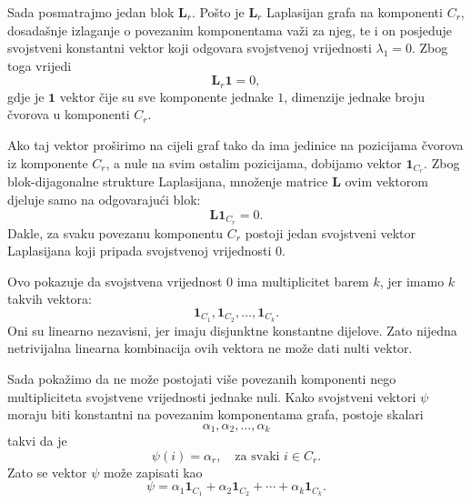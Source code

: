    Sada posmatrajmo jedan blok \(\mathbf{L}_r\). Pošto je \(\mathbf{L}_r\) Laplasijan grafa na
 komponenti \(C_r\), dosadašnje izlaganje o povezanim komponentama važi za njeg, te i on posjeduje svojstveni konstantni vektor koji odgovara svojstvenoj vrijednosti \(\lambda_1=0\). Zbog toga vrijedi
   \begin{equation}
   \mathbf{L}_r \mathbf{1} = 0,
   \end{equation}
   gdje je \(\mathbf{1}\) vektor čije su sve komponente jednake \(1\), dimenzije jednake broju čvorova
 u komponenti \(C_r\).

   Ako taj vektor proširimo na cijeli graf tako da ima jedinice na pozicijama čvorova iz komponente
 \(C_r\), a nule na svim ostalim pozicijama, dobijamo vektor \(\mathbf{1}_{C_r}\). Zbog
 blok-dijagonalne strukture Laplasijana, množenje matrice \(\mathbf{L}\) ovim vektorom djeluje samo na
 odgovarajući blok:
   \begin{equation}
   \mathbf{L}\mathbf{1}_{C_r} = 0.
   \end{equation}
   Dakle, za svaku povezanu komponentu \(C_r\) postoji jedan svojstveni vektor Laplasijana koji pripada
 svojstvenoj vrijednosti \(0\).

   Ovo pokazuje da svojstvena vrijednost \(0\) ima multiplicitet barem \(k\), jer imamo \(k\) takvih
 vektora:
   \begin{equation}
   \mathbf{1}_{C_1}, \mathbf{1}_{C_2}, \ldots, \mathbf{1}_{C_k}.
   \end{equation}
   Oni su linearno nezavisni, jer imaju disjunktne konstantne dijelove. Zato nijedna netrivijalna linearna kombinacija ovih vektora ne može dati nulti vektor.

Sada pokažimo da ne može postojati više povezanih komponenti nego multipliciteta svojstvene vrijednosti jednake nuli. Kako svojstveni vektori \(\psi\) moraju biti konstantni na povezanim komponentama grafa, postoje skalari
   \begin{equation}
       \alpha_1,\alpha_2,\ldots,\alpha_k
   \end{equation}
   takvi da je
   \begin{equation}
       \psi(i)=\alpha_r,
        \quad \text{za svaki } i\in C_r.
   \end{equation}
   Zato se vektor \(\psi\) može zapisati kao
   \begin{equation}
       \psi
       =
       \alpha_1\mathbf{1}_{C_1}
       +
       \alpha_2\mathbf{1}_{C_2}
       +
       \cdots
       +
       \alpha_k\mathbf{1}_{C_k}.
   \end{equation}

